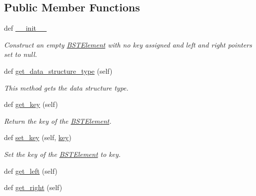 \subsection*{Public Member Functions}
\begin{DoxyCompactItemize}
\item 
def \hyperlink{class_bridges_1_1_b_s_t_element_1_1_b_s_t_element_a1b462ad2130adf1d09dbbd6287e7a57b}{\+\_\+\+\_\+init\+\_\+\+\_\+}
\begin{DoxyCompactList}\small\item\em Construct an empty \hyperlink{class_bridges_1_1_b_s_t_element_1_1_b_s_t_element}{B\+S\+T\+Element} with no key assigned and left and right pointers set to null. \end{DoxyCompactList}\item 
def \hyperlink{class_bridges_1_1_b_s_t_element_1_1_b_s_t_element_a291061a5223baf43a84616d10a5cfd61}{get\+\_\+data\+\_\+structure\+\_\+type} (self)
\begin{DoxyCompactList}\small\item\em This method gets the data structure type. \end{DoxyCompactList}\item 
def \hyperlink{class_bridges_1_1_b_s_t_element_1_1_b_s_t_element_ad28d941484956bcae3b4bbfba2c8f8e4}{get\+\_\+key} (self)
\begin{DoxyCompactList}\small\item\em Return the key of the \hyperlink{class_bridges_1_1_b_s_t_element_1_1_b_s_t_element}{B\+S\+T\+Element}. \end{DoxyCompactList}\item 
def \hyperlink{class_bridges_1_1_b_s_t_element_1_1_b_s_t_element_a88a0a40bb39e33d5f7d7a75f5f498ea0}{set\+\_\+key} (self, \hyperlink{class_bridges_1_1_b_s_t_element_1_1_b_s_t_element_af976c2c03465e6d1bdfaa528587330b0}{key})
\begin{DoxyCompactList}\small\item\em Set the key of the \hyperlink{class_bridges_1_1_b_s_t_element_1_1_b_s_t_element}{B\+S\+T\+Element} to key. \end{DoxyCompactList}\item 
def \hyperlink{class_bridges_1_1_b_s_t_element_1_1_b_s_t_element_aae6923e72c6bede9f8de54cab1104852}{get\+\_\+left} (self)
\item 
def \hyperlink{class_bridges_1_1_b_s_t_element_1_1_b_s_t_element_aa307077e096373b7ebf9ece22eb61c69}{get\+\_\+right} (self)
\end{DoxyCompactItemize}
